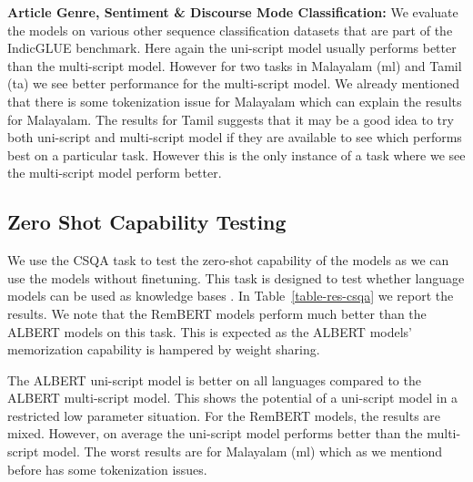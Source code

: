 \documentclass[11pt]{article}
\begin{document}
\textbf{Article Genre, Sentiment \& Discourse Mode Classification:} We evaluate the models on various other sequence classification datasets that are part of the IndicGLUE benchmark. Here again the uni-script model usually performs better than the multi-script model. However for two tasks in Malayalam (ml) and Tamil (ta) we see better performance for the multi-script model. We already mentioned that there is some tokenization issue for Malayalam which can explain the results for Malayalam. The results for Tamil suggests that it may be a good idea to try both uni-script and multi-script model if they are available to see which performs best on a particular task. However this is the only instance of a task where we see the multi-script model perform better.





\subsection{Zero Shot Capability Testing}
We use the CSQA task to test the zero-shot capability of the models as we can use the models without finetuning.
This task is designed to test whether language models can be used as knowledge bases \citep{petroni-etal-2019-language}. In Table~\ref{table-res-csqa} we report the results. 
We note that the RemBERT models perform much better than the ALBERT models on this task. This is expected as the ALBERT models' memorization capability is hampered by weight sharing.

The ALBERT uni-script model is better on all languages compared to the ALBERT multi-script model. This shows the potential of a uni-script model in a restricted low parameter situation. For the RemBERT models, the results are mixed. However, on average the uni-script model performs better than the  multi-script model. The worst results are for Malayalam (ml) which as we mentiond before has some tokenization issues.
\end{document}
